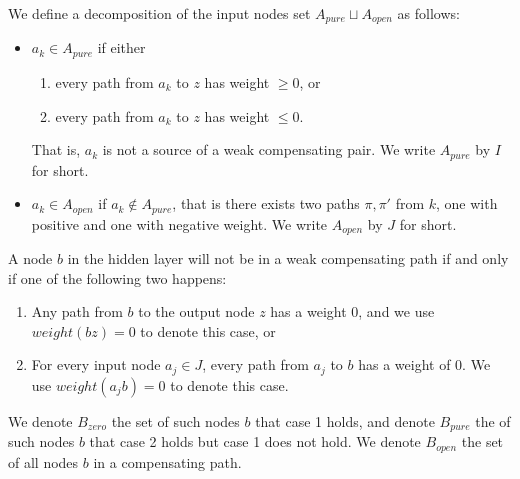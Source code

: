 			
			
			
			\begin{definition}
				We define a decomposition of the input nodes set $A_{pure}\sqcup A_{open}$ as follows:  
				\begin{itemize}
					\item $a_k \in A_{pure}$  if either
					\begin{enumerate}
						\item every path from $a_k$ to $z$ has weight $\geq 0$, or
						\item every path from $a_k$ to $z$ has weight $\leq 0$. 
						
					\end{enumerate}
					That is, $a_k$ is not a source of a weak compensating pair. 	We write $A_{pure}$ by $I$ for short.
					\item $a_k \in A_{open}$ if $a_k \notin A_{pure}$, that is there exists two paths $\pi,\pi'$ from $k$, 
					one with positive and one with negative weight. 	We write $A_{open}$ by $J$ for short.
				\end{itemize}
			\end{definition} 
			
			
			
			\begin{lemma} \label{lem:open_node_2}
				A node $b$ in the hidden layer will not be in a weak compensating path if and only if one of the following two happens:
				\begin{enumerate}
					\item Any path from $b$ to the output node $z$ has a weight $0$, and we use $weight({bz})=0$ to denote this case, or
					\item For every input node $a_j\in J$, every path from $a_j$ to $b$ has a weight of $0$. We use $weight({a_jb})=0$ to denote this case.
				\end{enumerate}
				
			\end{lemma}
			
			We denote $B_{zero}$ the set of such nodes $b$ that case 1 holds, and denote $B_{pure}$ the of such nodes $b$ that case 2 holds but case 1 does not hold.	We denote $B_{open}$ the set of all nodes $b$ in a compensating path.
			
